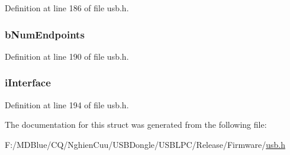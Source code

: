 Definition at line 186 of file usb.h.

\hypertarget{struct___u_s_b___i_n_t_e_r_f_a_c_e___d_e_s_c_r_i_p_t_o_r_af320b931ec8067dd32e27ba0e23e438a}{
\subsubsection[{bNumEndpoints}]{ {\bf bNumEndpoints}}}
\label{struct___u_s_b___i_n_t_e_r_f_a_c_e___d_e_s_c_r_i_p_t_o_r_af320b931ec8067dd32e27ba0e23e438a}


Definition at line 190 of file usb.h.

\hypertarget{struct___u_s_b___i_n_t_e_r_f_a_c_e___d_e_s_c_r_i_p_t_o_r_ac0fb618c55b8c62548531ed557fa8494}{
\subsubsection[{iInterface}]{ {\bf iInterface}}}
\label{struct___u_s_b___i_n_t_e_r_f_a_c_e___d_e_s_c_r_i_p_t_o_r_ac0fb618c55b8c62548531ed557fa8494}


Definition at line 194 of file usb.h.



The documentation for this struct was generated from the following file:\begin{DoxyCompactItemize}
\item 
F:/MDBlue/CQ/NghienCuu/USBDongle/USBLPC/Release/Firmware/\hyperlink{usb_8h}{usb.h}\end{DoxyCompactItemize}
